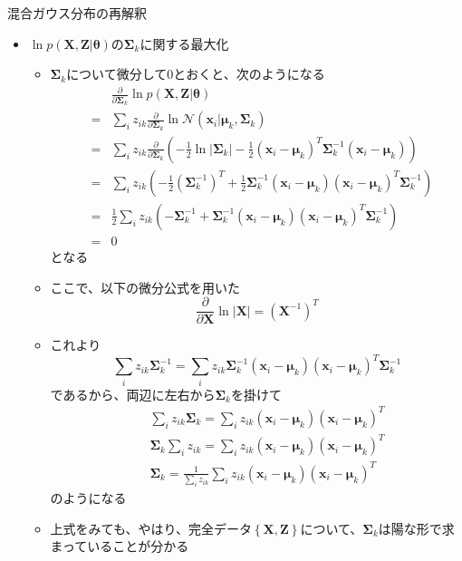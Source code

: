 \documentclass[dvipdfmx,notheorems,t]{beamer}
\begin{document}
\begin{frame}{混合ガウス分布の再解釈}

\begin{itemize}
	\item $\ln p(\bm{X}, \bm{Z} | \bm{\theta})$の$\bm{\Sigma}_k$に関する最大化
	\begin{itemize}
		\item $\bm{\Sigma}_k$について微分して$0$とおくと、次のようになる
		\begin{eqnarray}
			&& \frac{\partial}{\partial \bm{\Sigma}_k} \ln p(\bm{X}, \bm{Z} | \bm{\theta}) \nonumber \\
			&=& \sum_i z_{ik} \frac{\partial}{\partial \bm{\Sigma}_k} \ln \mathcal{N}(\bm{x}_i | \bm{\mu}_k, \bm{\Sigma}_k) \nonumber \\
			&=& \sum_i z_{ik} \frac{\partial}{\partial \bm{\Sigma}_k} \left( -\frac{1}{2} \ln |\bm{\Sigma}_k| - \frac{1}{2} (\bm{x}_i - \bm{\mu}_k)^T \bm{\Sigma}_k^{-1} (\bm{x}_i - \bm{\mu}_k) \right) \nonumber \\
			&=& \sum_i z_{ik} \left( -\frac{1}{2} \left( \bm{\Sigma}_k^{-1} \right)^T + \frac{1}{2} \bm{\Sigma}_k^{-1} (\bm{x}_i - \bm{\mu}_k) (\bm{x}_i - \bm{\mu}_k)^T \bm{\Sigma}_k^{-1} \right) \nonumber \\
			&=& \frac{1}{2} \sum_i z_{ik} \left( - \bm{\Sigma}_k^{-1} + \bm{\Sigma}_k^{-1} (\bm{x}_i - \bm{\mu}_k) (\bm{x}_i - \bm{\mu}_k)^T \bm{\Sigma}_k^{-1} \right) \\
			&=& 0 \nonumber
		\end{eqnarray}
		となる
		\item ここで、以下の微分公式を用いた
		\begin{equation}
			\frac{\partial}{\partial \bm{X}} \ln |\bm{X}| = \left( \bm{X}^{-1} \right)^T
		\end{equation}
		\item これより
		\begin{equation}
			\sum_i z_{ik} \bm{\Sigma}_k^{-1} = \sum_i z_{ik} \bm{\Sigma}_k^{-1} (\bm{x}_i - \bm{\mu}_k) (\bm{x}_i - \bm{\mu}_k)^T \bm{\Sigma}_k^{-1}
		\end{equation}
		であるから、両辺に左右から$\bm{\Sigma}_k$を掛けて
		\begin{eqnarray}
			&& \sum_i z_{ik} \bm{\Sigma}_k = \sum_i z_{ik} (\bm{x}_i - \bm{\mu}_k) (\bm{x}_i - \bm{\mu}_k)^T \nonumber \\
			&& \bm{\Sigma}_k \sum_i z_{ik} = \sum_i z_{ik} (\bm{x}_i - \bm{\mu}_k) (\bm{x}_i - \bm{\mu}_k)^T \nonumber \\
			&& \bm{\Sigma}_k = \frac{1}{\sum_i z_{ik}} \sum_i z_{ik} (\bm{x}_i - \bm{\mu}_k) (\bm{x}_i - \bm{\mu}_k)^T
		\end{eqnarray}
		のようになる
		
		\item 上式をみても、やはり、完全データ$\left\{ \bm{X}, \bm{Z} \right\}$について、$\bm{\Sigma}_k$は陽な形で求まっていることが分かる
	\end{itemize}
\end{itemize}

\end{frame}
\end{document}
